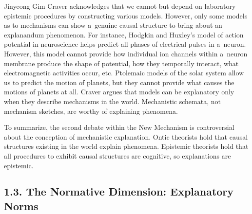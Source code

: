 \begin{artengenv}{Jinyeong Gim}
Craver acknowledges that we cannot but depend on laboratory epistemic procedures by constructing various models. However, only some models as to mechanisms can show a~genuine causal structure to bring about an explanandum phenomenon. For instance, Hodgkin and Huxley's model of action potential in neuroscience helps predict all phases of electrical pulses in a~neuron. However, this model cannot provide how individual ion channels within a~neuron membrane produce the shape of potential, how they temporally interact, what electromagnetic activities occur, etc. Ptolemaic models of the solar system allow us to predict the motion of planets, but they cannot provide what causes the motions of planets at all. Craver
\parencite*[][p.367]{craver_when_2006} %
 argues that models can be explanatory only when they describe mechanisms in the world. Mechanistic schemata, not mechanism sketches, are worthy of explaining phenomena.

To summarize, the second debate within the New Mechanism is controversial about the conception of mechanistic explanation. Ontic theorists hold that causal structures existing in the world explain phenomena. Epistemic theorists hold that all procedures to exhibit causal structures are cognitive, so explanations are epistemic.

\subsection{1.3. The Normative Dimension: Explanatory Norms}


\end{artengenv}
